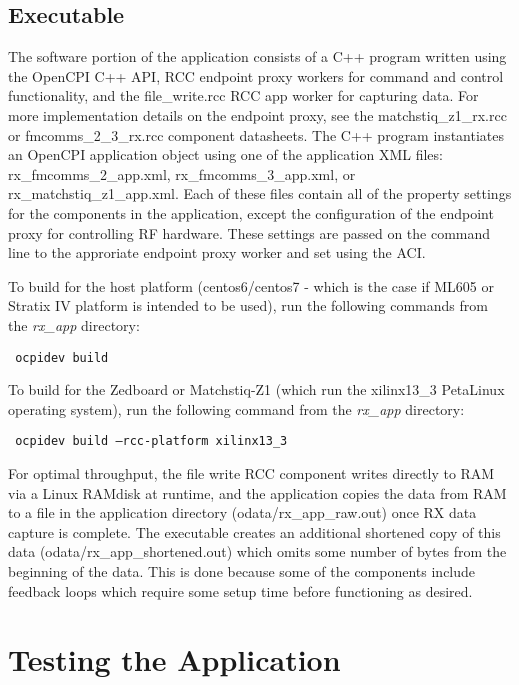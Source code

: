 \subsection{Executable}
\noindent The software portion of the application consists of a C++ program written using the OpenCPI C++ API, RCC endpoint proxy workers for command and control functionality, and the file\_write.rcc RCC app worker for capturing data. For more implementation details on the endpoint proxy, see the matchstiq\_z1\_rx.rcc or fmcomms\_2\_3\_rx.rcc component datasheets. The C++ program instantiates an OpenCPI application object using one of the application XML files: rx\_fmcomms\_2\_app.xml, rx\_fmcomms\_3\_app.xml, or rx\_matchstiq\_z1\_app.xml. Each of these files contain all of the property settings for the components in the application, except the configuration of the endpoint proxy for controlling RF hardware. These settings are passed on the command line to the approriate endpoint proxy worker and set using the ACI.\par\bigskip
To build for the host platform (centos6/centos7 - which is the case if ML605 or Stratix IV platform is intended to be used), run the following commands from the \textit{rx\_app} directory:\par\medskip
\texttt{ ocpidev build}\par\medskip
\noindent To build for the Zedboard or Matchstiq-Z1 (which run the xilinx13\_3 PetaLinux operating system), run the following command from the \textit{rx\_app} directory:\par\medskip
\texttt{ ocpidev build --rcc-platform xilinx13\_3 }\par\medskip
\noindent For optimal throughput, the file write RCC component writes directly to RAM via a Linux RAMdisk at runtime, and the application copies the data from RAM to a file in the application directory (odata/rx\_app\_raw.out) once RX data capture is complete. The executable creates an additional shortened copy of this data (odata/rx\_app\_shortened.out) which omits some number of bytes from the beginning of the data. This is done because some of the components include feedback loops which require some setup time before functioning as desired.
\section{Testing the Application}
